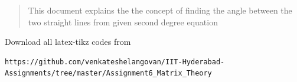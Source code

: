 \documentclass[journal,12pt,twocolumn]{IEEEtran}
\begin{document}
% 
\maketitle
\newpage
\bigskip
\renewcommand{\thefigure}{\theenumi}
\renewcommand{\thetable}{\theenumi}
%
%
\begin{abstract}
This document explains the the concept of finding the angle between the two straight lines from given second degree equation 
\end{abstract}
Download all latex-tikz codes from 
%
\begin{lstlisting}
https://github.com/venkateshelangovan/IIT-Hyderabad-Assignments/tree/master/Assignment6_Matrix_Theory
\end{lstlisting}
%
\end{document}
